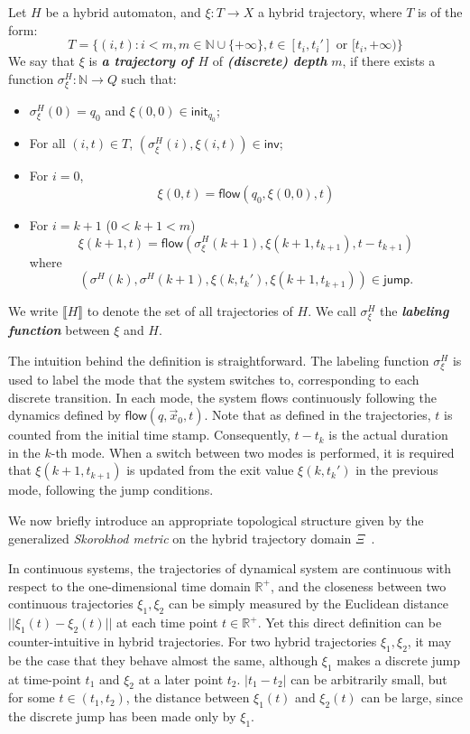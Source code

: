 \documentclass[envcountsect]{llncs}
\newcommand{\flow}{\mathsf{flow}}
\newcommand{\jump}{\mathsf{jump}}
\newcommand{\inv}{\mathsf{inv}}
\newcommand{\init}{\mathsf{init}}
\newcommand{\lrf}{\mathcal{L}_{\mathbb{R}_{\mathcal{F}}}}
\begin{document}
\begin{definition}\label{trajec}
Let $H$ be a hybrid automaton, and $\xi: T\rightarrow X$ a hybrid trajectory, where $T$ is of the form:
$$T = \{(i,t): i< m, m\in \mathbb{N}\cup\{+\infty\}, t\in [t_i, t_i'] \mbox{ or } [t_i, +\infty) \}$$
We say that $\xi$ is {\bf\em a trajectory of $H$} of {\bf\em (discrete) depth} $m$, if there exists a function $\sigma^H_{\xi}: \mathbb{N}\rightarrow Q$ such that:
\begin{itemize}
\item $\sigma^H_{\xi}(0) = q_0$ and $\xi(0,0)\in \init_{q_0}$;
\item For all $(i, t)\in T$, $(\sigma^H_{\xi}(i), \xi(i,t))\in \inv$;
\item For $i=0$,
$$\xi(0,t) = \flow(q_0, \xi(0,0), t)$$ 
\item For $i = k+1$ ($0< k+1<m$)
$$\xi(k+1, t) = \flow( \sigma^H_{\xi}(k+1), \xi(k+1, t_{k+1}), t - t_{k+1})$$
where 
$$(\sigma^H(k), \sigma^H(k+1), \xi(k, t_k'), \xi(k+1,t_{k+1}))\in \jump.$$ 
\end{itemize}
We write $\llbracket H\rrbracket$ to denote the set of all trajectories of $H$. We call $\sigma^H_{\xi}$ the {\bf\em labeling function} between $\xi$ and $H$.
\end{definition}

The intuition behind the definition is straightforward. The labeling function $\sigma_{\xi}^H$ is used to label the mode that the system switches to, corresponding to each discrete transition. In each mode, the system flows continuously following the dynamics defined by $\flow(q, \vec x_0, t)$. Note that as defined in the trajectories, $t$ is counted from the initial time stamp. Consequently, $t-t_k$ is the actual duration in the $k$-th mode. When a switch between  two modes is performed, it is required that $\xi(k+1, t_{k+1})$ is updated from the exit value $\xi(k, t_k')$ in the previous mode, following the jump conditions.


We now briefly introduce an appropriate topological structure given by the generalized {\em Skorokhod metric} on the hybrid trajectory domain $\Xi$~\cite{Collins04,Davoren09}.

In continuous systems, the trajectories of dynamical system are continuous with respect to the one-dimensional time domain $\mathbb{R}^+$, and the closeness between two continuous trajectories $\xi_1,\xi_2$ can be simply measured by the Euclidean distance $||\xi_1(t)-\xi_2(t)||$ at each time point $t\in \mathbb{R}^+$. Yet this direct definition can be counter-intuitive in hybrid trajectories. For two hybrid trajectories $\xi_1, \xi_2$, it may be the case that they behave almost the same, although $\xi_1$ makes a discrete jump at time-point $t_1$ and $\xi_2$ at a later point $t_2$. $|t_1-t_2|$ can be arbitrarily small, but for some $t\in (t_1,t_2)$, the distance between $\xi_1(t)$ and $\xi_2(t)$ can be large, since the discrete jump has been made only by $\xi_1$. 
\end{document}
